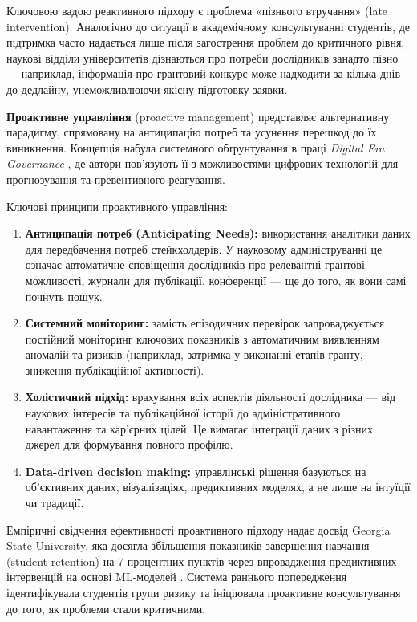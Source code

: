 Ключовою вадою реактивного підходу є проблема «пізнього втручання» (late intervention). Аналогічно до ситуації в академічному консультуванні студентів, де підтримка часто надається лише після загострення проблем до критичного рівня, наукові відділи університетів дізнаються про потреби дослідників занадто пізно --- наприклад, інформація про грантовий конкурс може надходити за кілька днів до дедлайну, унеможливлюючи якісну підготовку заявки.

\textbf{Проактивне управління} (proactive management) представляє альтернативну парадигму, спрямовану на антиципацію потреб та усунення перешкод до їх виникнення. Концепція набула системного обґрунтування в праці \textit{Digital Era Governance} \cite{Dunleavy2006DigitalEraGovernance}, де автори пов'язують її з можливостями цифрових технологій для прогнозування та превентивного реагування.

Ключові принципи проактивного управління:

\begin{enumerate}[leftmargin=*,itemsep=0.2em]
\item \textbf{Антиципація потреб (Anticipating Needs):} використання аналітики даних для передбачення потреб стейкхолдерів. У науковому адмініструванні це означає автоматичне сповіщення дослідників про релевантні грантові можливості, журнали для публікації, конференції --- ще до того, як вони самі почнуть пошук.
\item \textbf{Системний моніторинг:} замість епізодичних перевірок запроваджується постійний моніторинг ключових показників з автоматичним виявленням аномалій та ризиків (наприклад, затримка у виконанні етапів гранту, зниження публікаційної активності).
\item \textbf{Холістичний підхід:} врахування всіх аспектів діяльності дослідника --- від наукових інтересів та публікаційної історії до адміністративного навантаження та кар'єрних цілей. Це вимагає інтеграції даних з різних джерел для формування повного профілю.
\item \textbf{Data-driven decision making:} управлінські рішення базуються на об'єктивних даних, візуалізаціях, предиктивних моделях, а не лише на інтуїції чи традиції.
\end{enumerate}

Емпіричні свідчення ефективності проактивного підходу надає досвід Georgia State University, яка досягла збільшення показників завершення навчання (student retention) на 7 процентних пунктів через впровадження предиктивних інтервенцій на основі ML-моделей \cite{GeorgiaState2019StudentSuccessPredictive}. Система раннього попередження ідентифікувала студентів групи ризику та ініціювала проактивне консультування до того, як проблеми стали критичними.

